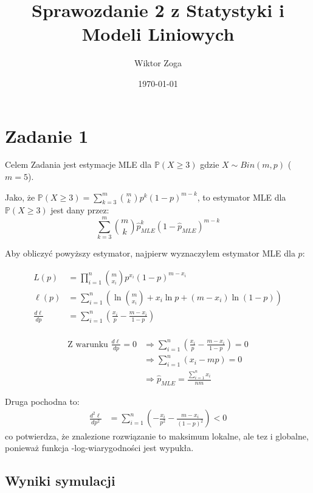 \documentclass[a4paper,12pt]{article}
\title{Sprawozdanie 2 z Statystyki i Modeli Liniowych}
\author{Wiktor Zoga}
\date{\today}
\begin{document}
\maketitle
\newpage

\section{Zadanie 1}

    Celem Zadania jest estymacje MLE dla $\mathbb{P}(X \ge 3)$ gdzie $X\sim Bin(m, p)$ ($ m = 5 $).

    Jako, że $ \mathbb{P}(X \ge 3) = \sum_{k=3}^{m} \binom{m}{k} p^k (1-p)^{m-k} $, 
    to estymator MLE dla $ \mathbb{P}(X \ge 3) $ jest dany przez:
    $$ \sum_{k=3}^{m} \binom{m}{k} \hat{p}_{MLE}^k (1-\hat{p}_{MLE})^{m-k} $$

    Aby obliczyć powyższy estymator, najpierw wyznaczyłem estymator MLE dla $p$:

    \begin{align*}
        L(p) &= \prod_{i=1}^{n} \binom{m}{x_i} p^{x_i} (1-p)^{m-x_i} \\
        \ell(p) &= \sum_{i=1}^{n} \left( \ln \binom{m}{x_i} + x_i \ln p + (m-x_i) \ln(1-p) \right) \\
        \frac{d\ell}{dp} &= \sum_{i=1}^{n} \left( \frac{x_i}{p} - \frac{m-x_i}{1-p} \right) \\     
    \end{align*}

    \begin{align*}
        \text{Z warunku } \frac{d\ell}{dp} = 0 &\Rightarrow \sum_{i=1}^{n} \left( \frac{x_i}{p} - \frac{m-x_i}{1-p} \right) = 0 \\
        &\Rightarrow \sum_{i=1}^{n} \left( x_i - m p \right) = 0 \\
        &\Rightarrow \hat{p}_{MLE} = \frac{\sum_{i=1}^{n} x_i}{n m}
    \end{align*}

    Druga pochodna to:
    \begin{align*}
        \frac{d^2\ell}{dp^2} &= \sum_{i=1}^{n} \left( -\frac{x_i}{p^2} - \frac{m-x_i}{(1-p)^2} \right) < 0
    \end{align*}
    co potwierdza, że znalezione rozwiązanie to maksimum lokalne, ale tez i globalne, ponieważ funkcja -log-wiarygodności jest wypukła.

    \subsection{Wyniki symulacji}
\end{document}
